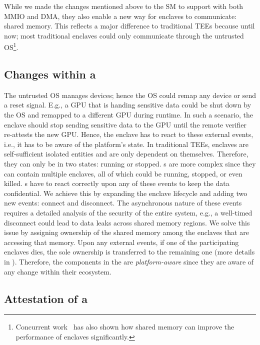 While we made the changes mentioned above to the SM to support \sphw with both MMIO and DMA, they also enable a new way for enclaves to communicate: shared memory. This reflects a major difference to traditional TEEs because until now; most traditional enclaves could only communicate through the untrusted OS\footnote{Concurrent work~\cite{yu2020elasticlave} has also shown how shared memory can improve the performance of enclaves significantly.}. 


\subsection{Changes within a \nameenclave{}}
\label{sec:overview:awareness}

The untrusted OS manages \sphw devices; hence the OS could remap any device or send a reset signal. E.g., a GPU that is handing sensitive data could be shut down by the OS and remapped to a different GPU during runtime. In such a scenario, the enclave should stop sending sensitive data to the GPU until the remote verifier re-attests the new GPU. Hence, the enclave has to react to these external events, i.e., it has to be aware of the platform's state. 
In traditional TEEs, enclaves are self-sufficient isolated entities and are only dependent on themselves. 
Therefore, they can only be in two states: running or stopped. \Nameenclave{}s are more complex since they can contain multiple enclaves, all of which could be running, stopped, or even killed. \Nameenclave{}s have to react correctly upon any of these events to keep the data confidential. We achieve this by expanding the enclave lifecycle and adding two new events: connect and disconnect. The asynchronous nature of these events requires a detailed analysis of the security of the entire system, e.g., a well-timed disconnect could lead to data leaks across shared memory regions. We solve this issue by assigning ownership of the shared memory among the enclaves that are accessing that memory. Upon any external events, if one of the participating enclaves dies, the sole ownership is transferred to the remaining one (more details in ). Therefore, the components in the \nameenclave are \emph{platform-aware} since they are aware of any change within their ecosystem.


\subsection{Attestation of a \nameenclave{}}


